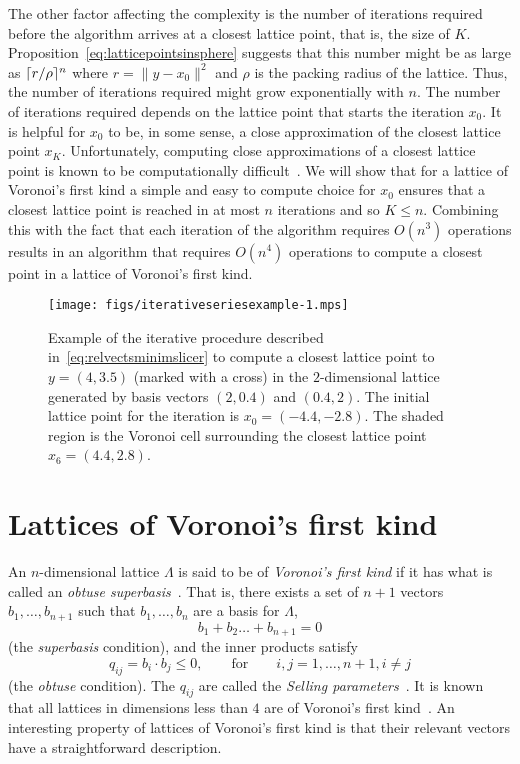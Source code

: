 \documentclass[final,leqno]{siamltex}
\begin{document}
The other factor affecting the complexity is the number of iterations required before the algorithm arrives at a closest lattice point, that is, the size of $K$.  Proposition~\ref{eq:latticepointsinsphere} suggests that this number might be as large as $\lceil r/\rho \rceil^n$ where $r = \|y - x_0\|^2$ and $\rho$ is the packing radius of the lattice.  Thus, the number of iterations required might grow exponentially with $n$.  The number of iterations required depends on the lattice point that starts the iteration $x_0$.  It is helpful for $x_0$ to be, in some sense, a close approximation of the closest lattice point $x_K$.  Unfortunately, computing close approximations of a closest lattice point is known to be computationally difficult~\cite{feige_inapproximability_2004}.  We will show that for a lattice of Voronoi's first kind a simple and easy to compute choice for $x_0$ ensures that a closest lattice point is reached in at most $n$ iterations and so $K \leq n$.  Combining this with the fact that each iteration of the algorithm requires $O(n^3)$ operations results in an algorithm that requires $O(n^4)$ operations to compute a closest point in a lattice of Voronoi's first kind. 


\begin{figure}[tp] 
	\centering      
		\texttt{[image: figs/iterativeseriesexample-1.mps]} 
		\caption{Example of the iterative procedure described in~\eqref{eq:relvectsminimslicer} to compute a closest lattice point to $y = (4,3.5)$ (marked with a cross) in the $2$-dimensional lattice generated by basis vectors $(2,0.4)$ and $(0.4,2)$.  The initial lattice point for the iteration is $x_0 = (-4.4,-2.8)$.  The shaded region is the Voronoi cell surrounding the closest lattice point $x_6 = (4.4,2.8)$.}       
		\label{lattices:fig:iterativeexample} 
\end{figure} 


\section{Lattices of Voronoi's first kind} \label{sec:latt-voron-first}

An $n$-dimensional lattice $\Lambda$ is said to be of \emph{Voronoi's first kind} if it has what is called an \emph{obtuse superbasis}~\cite{ConwaySloane1992_voronoi_lattice_3d_obtuse_superbases}.  That is, there exists a set of $n+1$ vectors $b_1,\dots,b_{n+1}$ such that $b_1,\dots,b_n$ are a basis for $\Lambda$,
\begin{equation}\label{eq:superbasecond}
b_1 + b_2 \dots + b_{n+1} = 0
\end{equation}
(the \emph{superbasis} condition), and the inner products satisfy
\begin{equation}\label{eq:obtusecond}
q_{ij} = b_i \cdot b_j \leq 0, \qquad \text{for} \qquad i,j = 1,\dots,n+1, i \neq j
\end{equation}
(the \emph{obtuse} condition).  The $q_{ij}$ are called the \emph{Selling parameters}~\cite{Selling1874}.  It is known that all lattices in dimensions less than $4$ are of Voronoi's first kind~\cite{ConwaySloane1992_voronoi_lattice_3d_obtuse_superbases}.  An interesting property of lattices of Voronoi's first kind is that their relevant vectors have a straightforward description.
\end{document}
